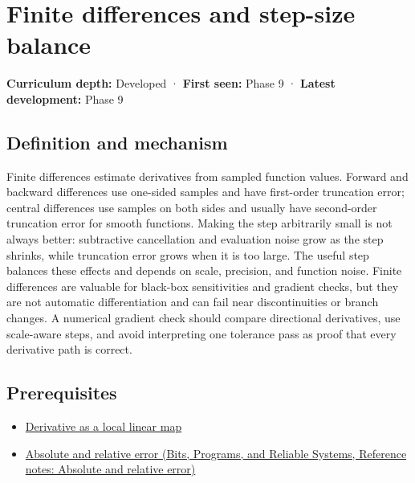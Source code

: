 \hypertarget{appendix-e2d7b4f2161d}{}\label{referencestart:appendix-e2d7b4f2161d}
\section{Finite differences and step-size balance}\label{appendix-e2d7b4f2161d-finite-differences-and-step-size-balance}

\textbf{Curriculum depth:} Developed · \textbf{First seen:} Phase 9 · \textbf{Latest development:} Phase 9

\begin{allmightroledefinition}

\subsection{Definition and mechanism}\label{appendix-e2d7b4f2161d-definition-and-mechanism}

Finite differences estimate derivatives from sampled function values. Forward and backward differences use one-sided samples and have first-order truncation error; central differences use samples on both sides and usually have second-order truncation error for smooth functions. Making the step arbitrarily small is not always better: subtractive cancellation and evaluation noise grow as the step shrinks, while truncation error grows when it is too large. The useful step balances these effects and depends on scale, precision, and function noise. Finite differences are valuable for black-box sensitivities and gradient checks, but they are not automatic differentiation and can fail near discontinuities or branch changes. A numerical gradient check should compare directional derivatives, use scale-aware steps, and avoid interpreting one tolerance pass as proof that every derivative path is correct.

\end{allmightroledefinition}

\subsection{Prerequisites}\label{appendix-e2d7b4f2161d-prerequisites}

\begin{itemize}
\tightlist
\item
  \hyperref[appendix-7bc181935c42]{Derivative as a local linear map}
\item
  \href{../01-Bits-Programs-and-Reliable-Systems/main.pdf\#nameddest=appendix-3ae74e89b4e6}{Absolute and relative error (Bits, Programs, and Reliable Systems, Reference notes: Absolute and relative error)}
\end{itemize}

